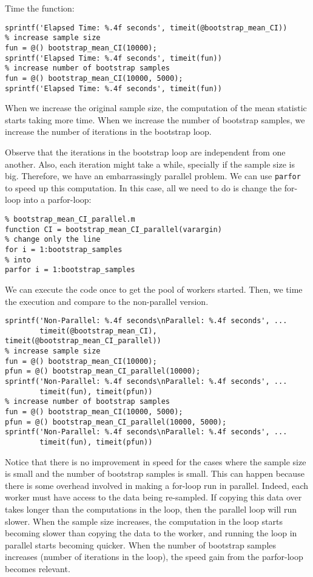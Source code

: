 \documentclass[12pt, a4paper]{article}
\begin{document}
Time the function:
\lstset{language=matlab,label= ,caption= ,captionpos=b,firstnumber=1,numbers=left,style=Matlab-editor}
\begin{lstlisting}
sprintf('Elapsed Time: %.4f seconds', timeit(@bootstrap_mean_CI))
% increase sample size
fun = @() bootstrap_mean_CI(10000);
sprintf('Elapsed Time: %.4f seconds', timeit(fun))
% increase number of bootstrap samples
fun = @() bootstrap_mean_CI(10000, 5000);
sprintf('Elapsed Time: %.4f seconds', timeit(fun))
\end{lstlisting}
When we increase the original sample size, the computation of the mean statistic starts taking more time.
When we increase the number of bootstrap samples, we increase the number of iterations in the bootstrap loop.

Observe that the iterations in the bootstrap loop are independent from one another.
Also, each iteration might take a while, specially if the sample size is big.
Therefore, we have an embarrassingly parallel problem.
We can use \texttt{parfor} to speed up this computation.
In this case, all we need to do is change the for-loop into a parfor-loop:
\lstset{language=matlab,label= ,caption= ,captionpos=b,firstnumber=1,numbers=left,style=Matlab-editor}
\begin{lstlisting}
% bootstrap_mean_CI_parallel.m
function CI = bootstrap_mean_CI_parallel(varargin)
% change only the line
for i = 1:bootstrap_samples
% into
parfor i = 1:bootstrap_samples
\end{lstlisting}
We can execute the code once to get the pool of workers started.
Then, we time the execution and compare to the non-parallel version.
\lstset{language=matlab,label= ,caption= ,captionpos=b,firstnumber=1,numbers=left,style=Matlab-editor}
\begin{lstlisting}
sprintf('Non-Parallel: %.4f seconds\nParallel: %.4f seconds', ...
        timeit(@bootstrap_mean_CI), timeit(@bootstrap_mean_CI_parallel))
% increase sample size
fun = @() bootstrap_mean_CI(10000);
pfun = @() bootstrap_mean_CI_parallel(10000);
sprintf('Non-Parallel: %.4f seconds\nParallel: %.4f seconds', ...
        timeit(fun), timeit(pfun))
% increase number of bootstrap samples
fun = @() bootstrap_mean_CI(10000, 5000);
pfun = @() bootstrap_mean_CI_parallel(10000, 5000);
sprintf('Non-Parallel: %.4f seconds\nParallel: %.4f seconds', ...
        timeit(fun), timeit(pfun))
\end{lstlisting}
Notice that there is no improvement in speed for the cases where the sample size is small and the number of bootstrap samples is small.
This can happen because there is some overhead involved in making a for-loop run in parallel.
Indeed, each worker must have access to the data being re-sampled.
If copying this data over takes longer than the computations in the loop, then the parallel loop will run slower.
When the sample size increases, the computation in the loop starts becoming slower than copying the data to the worker, and running the loop in parallel starts becoming quicker.
When the number of bootstrap samples increases (number of iterations in the loop), the speed gain from the parfor-loop becomes relevant.
\end{document}
